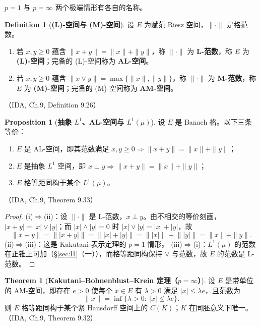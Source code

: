\documentclass[oneside]{book}
\theoremstyle{definition}
\theoremstyle{definition}
\newtheorem{proposition}{Proposition}[section]
\newtheorem{definition}{Definition}[section]
\newtheorem{theorem}{Theorem}[section]
\begin{document}
	$p=1$ 与 $p=\infty$ 两个极端情形有各自的名称。
	
	\begin{definition}[\bfseries{(L)-空间与 (M)-空间}]
		设 $E$ 为赋范 Riesz 空间，$\|\cdot\|$ 是格范数。
		\begin{enumerate}[label=(\arabic*),leftmargin=2.2em,itemsep=0.1em,topsep=0.3em]
			\item 若 $x,y\geqslant0$ 蕴含 $\|x+y\|=\|x\|+\|y\|$，称 $\|\cdot\|$ 为 \textbf{L-范数}，称 $E$ 为 \textbf{(L)-空间}；完备的 (L)-空间称为 \textbf{AL-空间}。
			\item 若 $x,y\geqslant0$ 蕴含 $\|x\vee y\|=\max\{\|x\|,\|y\|\}$，称 $\|\cdot\|$ 为 \textbf{M-范数}，称 $E$ 为 \textbf{(M)-空间}；完备的 (M)-空间称为 \textbf{AM-空间}。
		\end{enumerate}
		（IDA, Ch.9, Definition 9.26）
	\end{definition}
	
	\begin{proposition}[\bfseries{抽象 $L^{1}$、AL-空间与 $L^{1}(\mu)$}]
		设 $E$ 是 Banach 格。以下三条等价：
		\begin{enumerate}[label=(\roman*),leftmargin=2.2em,itemsep=0.1em,topsep=0.3em]
			\item $E$ 是 AL-空间，即其范数满足 $x,y\geqslant0\Rightarrow\|x+y\|=\|x\|+\|y\|$；
			\item $E$ 是抽象 $L^{1}$ 空间，即 $x\perp y\Rightarrow\|x+y\|=\|x\|+\|y\|$；
			\item $E$ 格等距同构于某个 $L^{1}(\mu)$。
		\end{enumerate}
		（IDA, Ch.9, Theorem 9.33）
	\end{proposition}
	
	\begin{proof}
		(i)$\Rightarrow$(ii)：设 $\|\cdot\|$ 是 L-范数，$x\perp y$。由不相交的等价刻画，$|x+y|=|x|\vee|y|$；而 $|x|\wedge|y|=0$ 时 $|x|\vee|y|=|x|+|y|$，故
		\[
		\|x+y\|=\big\||x+y|\big\|=\big\||x|+|y|\big\|=\big\||x|\big\|+\big\||y|\big\|=\|x\|+\|y\|.
		\]
		(ii)$\Rightarrow$(iii)：这是 Kakutani 表示定理的 $p=1$ 情形。
		(iii)$\Rightarrow$(i)：$L^{1}(\mu)$ 的范数在正锥上可加（\S\ref{sec:l1}（一）），而格等距同构保持 $\vee$ 与范数，故 $E$ 的范数是 L-范数。
	\end{proof}
	
	\begin{theorem}[\bfseries{Kakutani--Bohnenblust--Krein 定理（$p=\infty$）}]
		设 $E$ 是带单位的 AM-空间，即存在 $e>0$ 使每个 $x\in E$ 有 $\lambda>0$ 满足 $|x|\leqslant\lambda e$，且范数为
		\[
		\|x\|=\inf\{\lambda>0:\ |x|\leqslant\lambda e\}.
		\]
		则 $E$ 格等距同构于某个紧 Hausdorff 空间上的 $C(K)$；$K$ 在同胚意义下唯一。（IDA, Ch.9, Theorem 9.32）
	\end{theorem}
	
\end{document}
